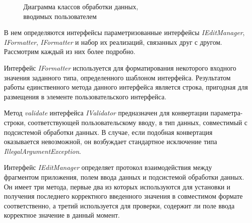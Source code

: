 \begin{figure}[h!]
  \centering
  \caption{Диаграмма классов обработки данных, \\ вводимых пользователем}
  \label{fig:implementation_ui_edit_manager}
\end{figure}

В нем определяются интерфейсы параметризованные интерфейсы
\textit{IEditManager}, \textit{IFormatter}, \textit{IFormatter}
и набор их реализаций, связанных друг с другом. Рассмотрим каждый из них более подробно.

Интерфейс \textit{IFormatter} используется для форматирования некоторого входного
значения заданного типа, определенного шаблоном интерфейса.
Результатом работы единственного метода данного интерфейса является строка,
пригодная для размещения в элементе пользовательского интерфейса.

Метод \textit{validate} интерфейса \textit{IValidator} предназначен для
конвертации параметра-строки, соответствующей пользовательскому вводу,
в тип данных, совместимый с подсистемой обработки данных. В случае,
если подобная конвертация оказывается невозможной, он возбуждает
стандартное исключение типа \textit{IllegalArgumentException}.

Интерфейс \textit{IEditManager} определяет протокол взаимодействия
между фрагментом приложения, полем ввода данных
и подсистемой обработки данных.
Он имеет три метода, первые два из которых используются
для установки и получения последнего корректного введенного значения
в совместимом формате соответственно, а третий используется для проверки,
содержит ли поле ввода корректное значение в данный момент.

